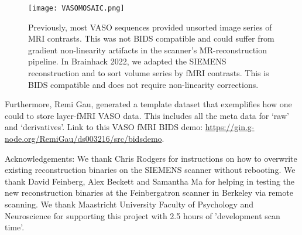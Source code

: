 \documentclass[../main.tex]{subfiles}
\begin{document}
\begin{figure}
	\centering
	\texttt{[image: VASOMOSAIC.png]}
	\caption{Previously, most VASO sequences provided unsorted image series of MRI contrasts. This was not BIDS compatible and could suffer from gradient non-linearity artifacts in the scanner’s MR-reconstruction pipeline. In Brainhack 2022, we adapted the SIEMENS reconstruction and to sort volume series by fMRI contrasts. This is BIDS compatible and does not require non-linearity corrections.
}
	\label{fig:VASOMOSAIC}
\end{figure}

Furthermore, Remi Gau, generated a template dataset that exemplifies how one could to store layer-fMRI VASO data. This includes all the meta data for ‘raw’ and ‘derivatives’. Link to this VASO fMRI BIDS demo: \href{https://gin.g-node.org/RemiGau/ds003216/src/bids_demo}{https://gin.g-node.org/RemiGau/ds003216/src/bids\textunderscore demo}.

Acknowledgements: We thank Chris Rodgers for instructions on how to overwrite existing reconstruction binaries on the SIEMENS scanner without rebooting. We thank David Feinberg, Alex Beckett and Samantha Ma for helping in testing the new reconstruction binaries at the Feinbergatron scanner in Berkeley via remote scanning. We thank Maastricht University Faculty of Psychology and Neuroscience for supporting this project with 2.5 hours of 'development scan time'.
\end{document}
